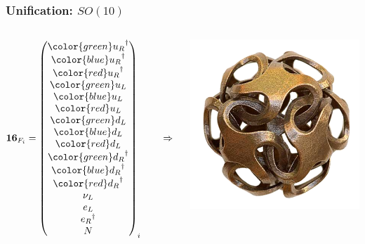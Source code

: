 \documentclass[%
xcolor=dvipsnames,table%
]{beamer}
\begin{document}
\begin{frame}
  \frametitle{Unification: $SO(10)$}
  \begin{columns}
    \begin{column}{0.7\textwidth}
      \begin{small}
  \begin{align*}
    \mathbf{16}_{F_{i}}=
    \begin{pmatrix}
      {{\color{green}u_{R}}^{\dagger}}\\
      {{\color{blue}u_{R}}^{\dagger}}\\
      {{\color{red}u_{R}}^{\dagger}}\\
      {{\color{green}u_{L}}}\\
      {{\color{blue}u_{L}}}\\
      {{\color{red}u_{L}}}\\
      {{\color{green}d_{L}}}\\
      {{\color{blue}d_{L}}}\\
      {{\color{red}d_{L}}}\\
      {{\color{green}d_{R}}^{\dagger}}\\
      {{\color{blue}d_{R}}^{\dagger}}\\
      {{\color{red}d_{R}}^{\dagger}}\\
      \nu_L\\
      e_L\\
      {e_{R}}^{\dagger}\\
      N\\
    \end{pmatrix}_{i} \qquad\Rightarrow \mathcal{L}_{SM}\supset h\, \mathbf{16}_F\times\mathbf{16}_{F}\times \mathbf{10}_{S}+\text{h.c}
  \end{align*}
      \end{small}
    \end{column}
    \begin{column}{0.3\textwidth}
  \hfill\includegraphics[scale=0.2]{sym}      
    \end{column}
  \end{columns}


\end{frame}
\end{document}

